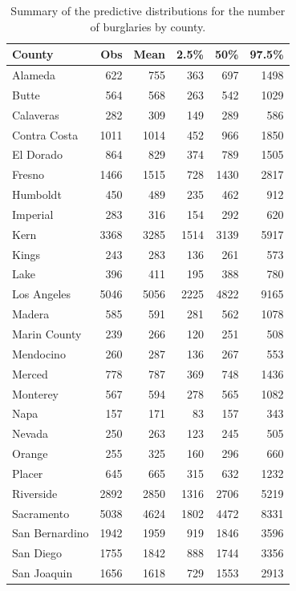 \documentclass{asaproc}
\begin{document}
\begin{table}[p!]
\caption{\enspace Summary of the predictive distributions for the number of burglaries by county.}
\centering
\begin{tabular}{lrrrrr}
\\ [-5pt]
County & Obs & Mean & 2.5\% & 50\% & 97.5\% \\ 
  \hline
Alameda & 622 & 755 & 363 & 697 & 1498 \\ 
  Butte & 564 & 568 & 263 & 542 & 1029 \\ 
  Calaveras & 282 & 309 & 149 & 289 & 586 \\ 
  Contra Costa & 1011 & 1014 & 452 & 966 & 1850 \\ 
  El Dorado & 864 & 829 & 374 & 789 & 1505 \\ 
  Fresno & 1466 & 1515 & 728 & 1430 & 2817 \\ 
  Humboldt & 450 & 489 & 235 & 462 & 912 \\ 
  Imperial & 283 & 316 & 154 & 292 & 620 \\ 
  Kern & 3368 & 3285 & 1514 & 3139 & 5917 \\ 
  Kings & 243 & 283 & 136 & 261 & 573 \\ 
  Lake & 396 & 411 & 195 & 388 & 780 \\ 
  Los Angeles & 5046 & 5056 & 2225 & 4822 & 9165 \\ 
  Madera & 585 & 591 & 281 & 562 & 1078 \\ 
  Marin County & 239 & 266 & 120 & 251 & 508 \\ 
  Mendocino & 260 & 287 & 136 & 267 & 553 \\ 
  Merced & 778 & 787 & 369 & 748 & 1436 \\ 
  Monterey & 567 & 594 & 278 & 565 & 1082 \\ 
  Napa & 157 & 171 & 83 & 157 & 343 \\ 
  Nevada & 250 & 263 & 123 & 245 & 505 \\ 
  Orange & 255 & 325 & 160 & 296 & 660 \\ 
  Placer & 645 & 665 & 315 & 632 & 1232 \\ 
  Riverside & 2892 & 2850 & 1316 & 2706 & 5219 \\ 
  Sacramento & 5038 & 4624 & 1802 & 4472 & 8331 \\ 
  San Bernardino & 1942 & 1959 & 919 & 1846 & 3596 \\ 
  San Diego & 1755 & 1842 & 888 & 1744 & 3356 \\ 
  San Joaquin & 1656 & 1618 & 729 & 1553 & 2913 \\ 

\end{tabular}
\end{table}
\end{document}
